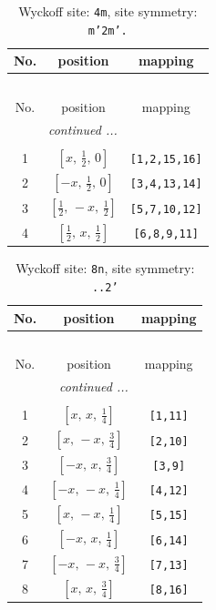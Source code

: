 \documentclass[fleqn,8pt]{jsarticle}
\begin{document}
\renewcommand{\arraystretch}{1.2}
\begin{longtable}{ccc}
\caption{Wyckoff site: {\tt 4m}, site symmetry: {\tt m'2m'.}}
 \\
 \hline \hline
No. & position & mapping \\ \hline \endfirsthead

\multicolumn{2}{l}{\tablename\ \thetable{}} \\
 \hline \hline
No. & position & mapping \\ \hline \endhead

 \hline \hline
\multicolumn{2}{r}{\footnotesize\it continued ...} \\ \endfoot

 \hline \hline
\multicolumn{2}{r}{} \\ \endlastfoot

1 & $\left[ x,\, \frac{1}{2},\, 0 \right]$ & {\tt [1,2,15,16]} \\ \hline
2 & $\left[ - x,\, \frac{1}{2},\, 0 \right]$ & {\tt [3,4,13,14]} \\ \hline
3 & $\left[ \frac{1}{2},\, - x,\, \frac{1}{2} \right]$ & {\tt [5,7,10,12]} \\ \hline
4 & $\left[ \frac{1}{2},\, x,\, \frac{1}{2} \right]$ & {\tt [6,8,9,11]} \\
\end{longtable}
\renewcommand{\arraystretch}{1.2}
\begin{longtable}{ccc}
\caption{Wyckoff site: {\tt 8n}, site symmetry: {\tt ..2'}}
 \\
 \hline \hline
No. & position & mapping \\ \hline \endfirsthead

\multicolumn{2}{l}{\tablename\ \thetable{}} \\
 \hline \hline
No. & position & mapping \\ \hline \endhead

 \hline \hline
\multicolumn{2}{r}{\footnotesize\it continued ...} \\ \endfoot

 \hline \hline
\multicolumn{2}{r}{} \\ \endlastfoot

1 & $\left[ x,\, x,\, \frac{1}{4} \right]$ & {\tt [1,11]} \\ \hline
2 & $\left[ x,\, - x,\, \frac{3}{4} \right]$ & {\tt [2,10]} \\ \hline
3 & $\left[ - x,\, x,\, \frac{3}{4} \right]$ & {\tt [3,9]} \\ \hline
4 & $\left[ - x,\, - x,\, \frac{1}{4} \right]$ & {\tt [4,12]} \\ \hline
5 & $\left[ x,\, - x,\, \frac{1}{4} \right]$ & {\tt [5,15]} \\ \hline
6 & $\left[ - x,\, x,\, \frac{1}{4} \right]$ & {\tt [6,14]} \\ \hline
7 & $\left[ - x,\, - x,\, \frac{3}{4} \right]$ & {\tt [7,13]} \\ \hline
8 & $\left[ x,\, x,\, \frac{3}{4} \right]$ & {\tt [8,16]} \\
\end{longtable}
\end{document}
